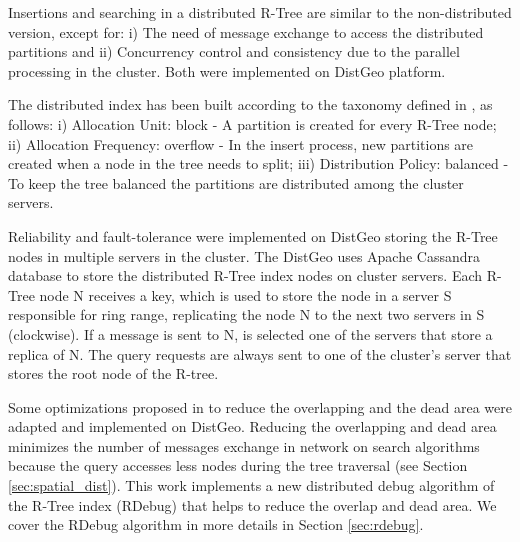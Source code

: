 Insertions and searching in a distributed R-Tree are similar to the non-distributed version, except for: i) The need of message exchange to access the distributed partitions and
ii) Concurrency control and consistency due to the parallel processing in the cluster. Both were implemented on DistGeo platform.

The distributed index has been built according to the taxonomy defined in \cite{an1999storing}, as follows: i) Allocation Unit: block - A partition is created for every R-Tree node; 
ii) Allocation Frequency: overflow - In the insert process, new partitions are created when a node in the tree needs to split; 
iii) Distribution Policy: balanced - To keep the tree balanced the partitions are distributed among the cluster servers.
	
Reliability and fault-tolerance were implemented on DistGeo storing the R-Tree nodes in multiple servers in the cluster. 
The DistGeo uses Apache Cassandra \cite{cassandra1apache} database to store the distributed R-Tree index nodes on cluster servers.
Each R-Tree node N receives a key, which is used to store the node in a server S responsible for ring range, replicating the node N to the next two servers in S (clockwise). 
If a message is sent to N, is selected one of the servers that store a replica of N.
The query requests are always sent to one of the cluster's server that stores the root node of the R-tree. 

Some optimizations proposed in \cite{beckmann1990r} to reduce the overlapping and the dead area were adapted and implemented on DistGeo. 
Reducing the overlapping and dead area minimizes the number of messages exchange in network on search algorithms because the query accesses less nodes during the tree traversal (see Section \ref{sec:spatial_dist}). 
This work implements a new distributed debug algorithm of the R-Tree index (RDebug) that helps to reduce the overlap and dead area.
We cover the RDebug algorithm in more details in Section \ref{sec:rdebug}.